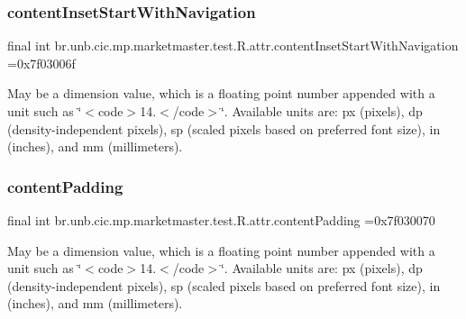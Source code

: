 \subsubsection{\texorpdfstring{content\+Inset\+Start\+With\+Navigation}{contentInsetStartWithNavigation}}
{\footnotesize\ttfamily final int br.\+unb.\+cic.\+mp.\+marketmaster.\+test.\+R.\+attr.\+content\+Inset\+Start\+With\+Navigation =0x7f03006f\hspace{0.3cm}{\ttfamily [static]}}

May be a dimension value, which is a floating point number appended with a unit such as \char`\"{}$<$code$>$14.\+5sp$<$/code$>$\char`\"{}. Available units are\+: px (pixels), dp (density-\/independent pixels), sp (scaled pixels based on preferred font size), in (inches), and mm (millimeters). \mbox{\label{classbr_1_1unb_1_1cic_1_1mp_1_1marketmaster_1_1test_1_1R_1_1attr_a959dbf57999ba5a5bccdf10c61d7cd12}} 
\subsubsection{\texorpdfstring{content\+Padding}{contentPadding}}
{\footnotesize\ttfamily final int br.\+unb.\+cic.\+mp.\+marketmaster.\+test.\+R.\+attr.\+content\+Padding =0x7f030070\hspace{0.3cm}{\ttfamily [static]}}

May be a dimension value, which is a floating point number appended with a unit such as \char`\"{}$<$code$>$14.\+5sp$<$/code$>$\char`\"{}. Available units are\+: px (pixels), dp (density-\/independent pixels), sp (scaled pixels based on preferred font size), in (inches), and mm (millimeters). \mbox{\label{classbr_1_1unb_1_1cic_1_1mp_1_1marketmaster_1_1test_1_1R_1_1attr_a046620320a5dffd664d94148ee637383}} 
